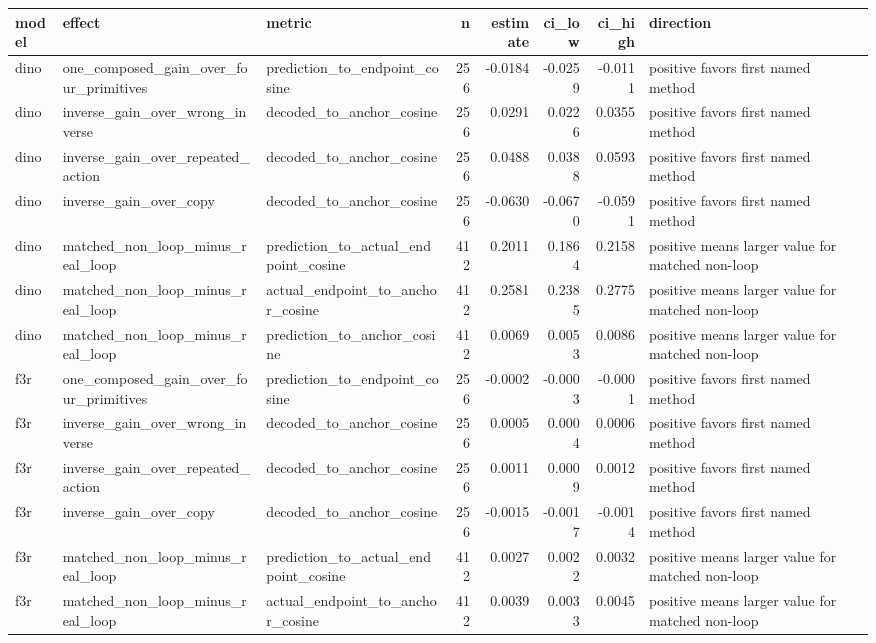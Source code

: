 \begin{tabular}{lllrrrrl}
\toprule
model & effect & metric & n & estimate & ci\_low & ci\_high & direction \\
\midrule
dino & one\_composed\_gain\_over\_four\_primitives & prediction\_to\_endpoint\_cosine & 256 & -0.0184 & -0.0259 & -0.0111 & positive favors first named method \\
dino & inverse\_gain\_over\_wrong\_inverse & decoded\_to\_anchor\_cosine & 256 & 0.0291 & 0.0226 & 0.0355 & positive favors first named method \\
dino & inverse\_gain\_over\_repeated\_action & decoded\_to\_anchor\_cosine & 256 & 0.0488 & 0.0388 & 0.0593 & positive favors first named method \\
dino & inverse\_gain\_over\_copy & decoded\_to\_anchor\_cosine & 256 & -0.0630 & -0.0670 & -0.0591 & positive favors first named method \\
dino & matched\_non\_loop\_minus\_real\_loop & prediction\_to\_actual\_endpoint\_cosine & 412 & 0.2011 & 0.1864 & 0.2158 & positive means larger value for matched non-loop \\
dino & matched\_non\_loop\_minus\_real\_loop & actual\_endpoint\_to\_anchor\_cosine & 412 & 0.2581 & 0.2385 & 0.2775 & positive means larger value for matched non-loop \\
dino & matched\_non\_loop\_minus\_real\_loop & prediction\_to\_anchor\_cosine & 412 & 0.0069 & 0.0053 & 0.0086 & positive means larger value for matched non-loop \\
f3r & one\_composed\_gain\_over\_four\_primitives & prediction\_to\_endpoint\_cosine & 256 & -0.0002 & -0.0003 & -0.0001 & positive favors first named method \\
f3r & inverse\_gain\_over\_wrong\_inverse & decoded\_to\_anchor\_cosine & 256 & 0.0005 & 0.0004 & 0.0006 & positive favors first named method \\
f3r & inverse\_gain\_over\_repeated\_action & decoded\_to\_anchor\_cosine & 256 & 0.0011 & 0.0009 & 0.0012 & positive favors first named method \\
f3r & inverse\_gain\_over\_copy & decoded\_to\_anchor\_cosine & 256 & -0.0015 & -0.0017 & -0.0014 & positive favors first named method \\
f3r & matched\_non\_loop\_minus\_real\_loop & prediction\_to\_actual\_endpoint\_cosine & 412 & 0.0027 & 0.0022 & 0.0032 & positive means larger value for matched non-loop \\
f3r & matched\_non\_loop\_minus\_real\_loop & actual\_endpoint\_to\_anchor\_cosine & 412 & 0.0039 & 0.0033 & 0.0045 & positive means larger value for matched non-loop \\

\end{tabular}
